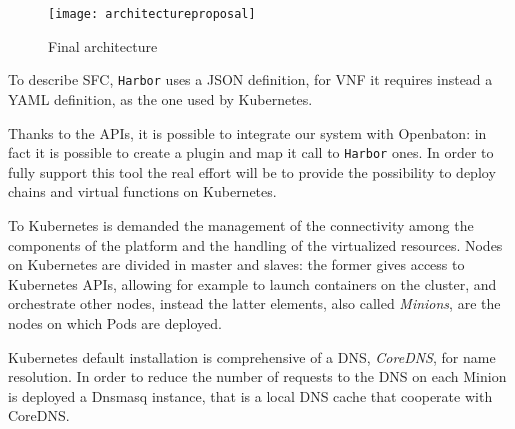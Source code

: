 \begin{figure}[H]
  \centering
  \texttt{[image: architectureproposal]}
  \caption{Final architecture}
  \label{chap:archimple:sec:secondattempt:img:attempt2v1harbor}
\end{figure}

To describe SFC, \texttt{Harbor} uses a JSON definition, for VNF it requires
instead a YAML definition, as the one used by Kubernetes. 

Thanks to the APIs, it is possible to integrate our system with Openbaton: in
fact it is possible to create a plugin and map it call to \texttt{Harbor} ones.
In order to fully support this tool the real effort will be to provide the
possibility to deploy chains and virtual functions on Kubernetes. 

To Kubernetes is demanded the management of the connectivity among the
components of the platform and the handling of the virtualized resources.
Nodes on Kubernetes are divided in master and slaves: the former gives access to
Kubernetes APIs, allowing for example to launch containers on the cluster, and
orchestrate other nodes, instead the latter elements, also called
\emph{Minions}, are the nodes on which Pods are deployed.

Kubernetes default installation is comprehensive of a DNS, \emph{CoreDNS}, for
name resolution. In order to reduce the number of requests to the DNS on each
Minion is deployed a Dnsmasq instance, that is a local DNS cache that cooperate
with CoreDNS.